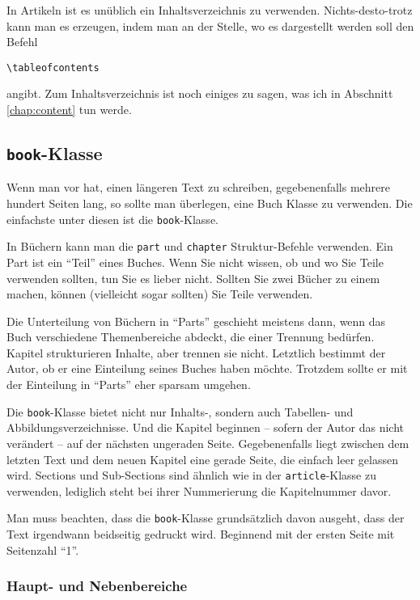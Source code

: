 In Artikeln ist es unüblich ein Inhaltsverzeichnis zu verwenden. Nichts-des\-to-trotz kann man es erzeugen, indem man an der Stelle, wo es dargestellt werden soll den Befehl
\begin{verbatim}
\tableofcontents
\end{verbatim}
angibt. Zum Inhaltsverzeichnis ist noch einiges zu sagen, was ich in Abschnitt \ref{chap:content} tun werde.


\subsection{\texttt{book}-Klasse}

Wenn man vor hat, einen längeren Text zu schreiben, gegebenenfalls mehrere hundert Seiten lang, so sollte man überlegen, eine Buch Klasse zu verwenden. Die einfachste unter diesen ist die \texttt{book}-Klasse.

In Büchern kann man die \texttt{part} und \texttt{chapter} Struktur-Befehle verwenden. Ein Part ist ein "`Teil"' eines Buches. Wenn Sie nicht wissen, ob und wo Sie Teile verwenden sollten, tun Sie es lieber nicht. Sollten Sie zwei Bücher zu einem machen, können (vielleicht sogar sollten) Sie Teile verwenden. 

Die Unterteilung von Büchern in "`Parts"' geschieht meistens dann, wenn das Buch verschiedene Themenbereiche abdeckt, die einer Trennung bedürfen. Kapitel strukturieren Inhalte, aber trennen sie nicht. Letztlich bestimmt der Autor, ob er eine Einteilung seines Buches haben möchte. Trotzdem sollte er mit der Einteilung in "`Parts"' eher sparsam umgehen.

Die \texttt{book}-Klasse bietet nicht nur Inhalts-, sondern auch Tabellen- und Abbildungsverzeichnisse. Und die Kapitel beginnen -- sofern der Autor das nicht verändert -- auf der nächsten ungeraden Seite. Gegebenenfalls liegt zwischen dem letzten Text und dem neuen Kapitel eine gerade Seite, die einfach leer gelassen wird. Sections und Sub-Sections sind ähnlich wie in der \texttt{article}-Klasse zu verwenden, lediglich steht bei ihrer Nummerierung die Kapitelnummer davor. 

Man muss beachten, dass die \texttt{book}-Klasse grundsätzlich davon ausgeht, dass der Text irgendwann beidseitig gedruckt wird. Beginnend mit der ersten Seite mit Seitenzahl "`1"'.

\subsubsection{Haupt- und Nebenbereiche}

